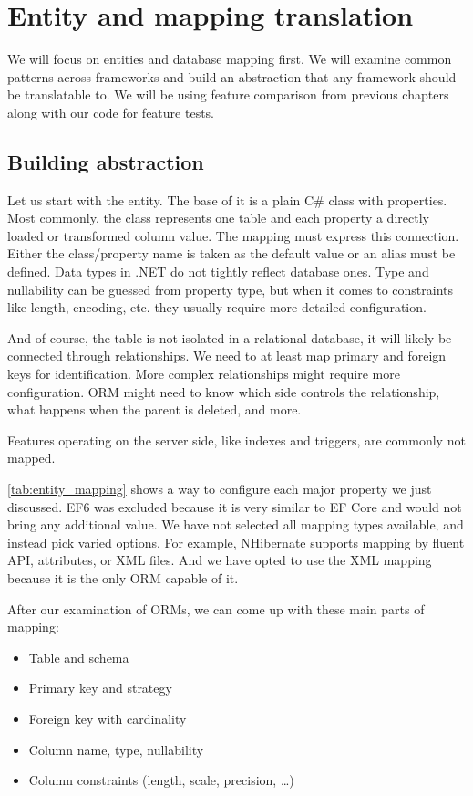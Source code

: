 \chapter{Entity and mapping translation}

We will focus on entities and database mapping first. We will examine common patterns across frameworks and build an abstraction that any framework should be translatable to. We will be using feature comparison from previous chapters along with our code for feature tests.

\section{Building abstraction}

Let us start with the entity. The base of it is a plain C\# class with properties. Most commonly, the class represents one table and each property a directly loaded or transformed column value. The mapping must express this connection. Either the class/property name is taken as the default value or an alias must be defined. Data types in .NET do not tightly reflect database ones. Type and nullability can be guessed from property type, but when it comes to constraints like length, encoding, etc. they usually require more detailed configuration.

And of course, the table is not isolated in a relational database, it will likely be connected through relationships. We need to at least map primary and foreign keys for identification. More complex relationships might require more configuration. ORM might need to know which side controls the relationship, what happens when the parent is deleted, and more.

Features operating on the server side, like indexes and triggers, are commonly not mapped.

\autoref{tab:entity_mapping} shows a way to configure each major property we just discussed. EF6 was excluded because it is very similar to EF Core and would not bring any additional value. We have not selected all mapping types available, and instead pick varied options. For example, NHibernate supports mapping by fluent API, attributes, or XML files. And we have opted to use the XML mapping because it is the only ORM capable of it.


After our examination of ORMs, we can come up with these main parts of mapping:
\begin{itemize}
    \item Table and schema
    \item Primary key and strategy
    \item Foreign key with cardinality
    \item Column name, type, nullability
    \item Column constraints (length, scale, precision, \ldots)
\end{itemize}



